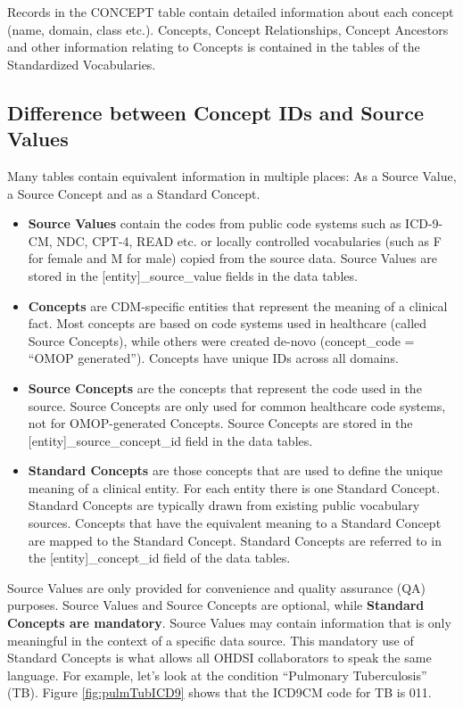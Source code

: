 \documentclass[11pt]{book}
\providecommand{\tightlist}{%
  \setlength{\itemsep}{0pt}\setlength{\parskip}{0pt}}
\begin{document}
Records in the CONCEPT table contain detailed information about each
concept (name, domain, class etc.). Concepts, Concept Relationships,
Concept Ancestors and other information relating to Concepts is
contained in the tables of the Standardized Vocabularies.

\subsection{Difference between Concept IDs and Source
Values}\label{difference-between-concept-ids-and-source-values}

Many tables contain equivalent information in multiple places: As a
Source Value, a Source Concept and as a Standard Concept.

\begin{itemize}
\tightlist
\item
  \textbf{Source Values} contain the codes from public code systems such
  as ICD-9-CM, NDC, CPT-4, READ etc. or locally controlled vocabularies
  (such as F for female and M for male) copied from the source data.
  Source Values are stored in the {[}entity{]}\_source\_value fields in
  the data tables.
\item
  \textbf{Concepts} are CDM-specific entities that represent the meaning
  of a clinical fact. Most concepts are based on code systems used in
  healthcare (called Source Concepts), while others were created de-novo
  (concept\_code = ``OMOP generated''). Concepts have unique IDs across
  all domains.
\item
  \textbf{Source Concepts} are the concepts that represent the code used
  in the source. Source Concepts are only used for common healthcare
  code systems, not for OMOP-generated Concepts. Source Concepts are
  stored in the {[}entity{]}\_source\_concept\_id field in the data
  tables.
\item
  \textbf{Standard Concepts} are those concepts that are used to define
  the unique meaning of a clinical entity. For each entity there is one
  Standard Concept. Standard Concepts are typically drawn from existing
  public vocabulary sources. Concepts that have the equivalent meaning
  to a Standard Concept are mapped to the Standard Concept. Standard
  Concepts are referred to in the {[}entity{]}\_concept\_id field of the
  data tables.
\end{itemize}

Source Values are only provided for convenience and quality assurance
(QA) purposes. Source Values and Source Concepts are optional, while
\textbf{Standard Concepts are mandatory}. Source Values may contain
information that is only meaningful in the context of a specific data
source. This mandatory use of Standard Concepts is what allows all OHDSI
collaborators to speak the same language. For example, let's look at the
condition ``Pulmonary Tuberculosis'' (TB). Figure \ref{fig:pulmTubICD9}
shows that the ICD9CM code for TB is 011.
\end{document}
